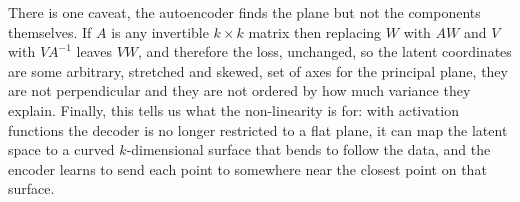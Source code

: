 \documentclass[12pt]{article}
\begin{document}
There is one caveat, the autoencoder finds the plane but not the
components themselves. If $A$ is any invertible $k\times k$ matrix
then replacing $W$ with $AW$ and $V$ with $VA^{-1}$ leaves $VW$, and
therefore the loss, unchanged, so the latent coordinates are some
arbitrary, stretched and skewed, set of axes for the principal plane,
they are not perpendicular and they are not ordered by how much
variance they explain. Finally, this tells us what the non-linearity
is for: with activation functions the decoder is no longer restricted
to a flat plane, it can map the latent space to a curved
$k$-dimensional surface that bends to follow the data, and the encoder
learns to send each point to somewhere near the closest point on that
surface.
\end{document}

